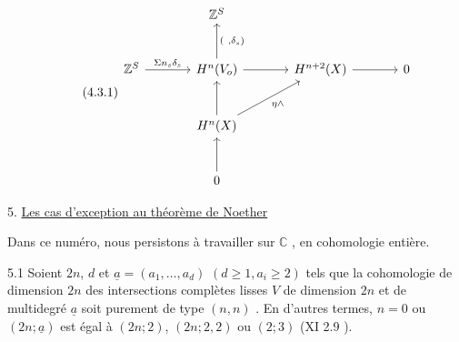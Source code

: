 \begin{equation}\tag{4.3.1}
\begin{tikzcd}[row sep=large, column sep=large]
{} & \mathbb{Z}^S & {} & {} \\
\mathbb{Z}^S \arrow[r, "{\Sigma n_s \delta_s}"] & H^n(V_o) \arrow[u, "{( \ , \delta_s)}"'] \arrow[r] & H^{n+2}(X) \arrow[r] & 0 \\
{} & H^n(X) \arrow[u] \arrow[ur, "{\eta\wedge}"'] & {} & {} \\
{} & 0 \arrow[u] & {} &
{} \end{tikzcd}
\end{equation}



5. \underline{Les cas d'exception au théorème de Noether}

Dans ce numéro, nous persistons à travailler sur $\mathbb{C}$ , en cohomologie entière.

5.1 \quad Soient $2n$, $d$ et $\underline{a} = (a_1,\ldots,a_d)$ $(d \geq 1, a_i \geq 2)$ tels que la cohomologie de dimension $2n$ des intersections complètes lisses $V$ de dimension $2n$ et de multidegré $\underline{a}$ soit purement de type $(n, n)$ . En d'autres termes, $n = 0$ ou $(2n; \underline{a})$ est égal à $(2n; 2)$, $(2n; 2, 2)$ ou $(2; 3)$ (XI 2.9 ).

